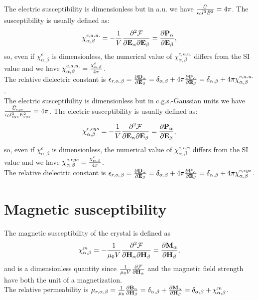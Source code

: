 \documentclass[12pt,a4paper]{article}
\begin{document}
{\color{web-blue} The electric susceptibility is dimensionless but
in a.u. we have
${\bar U \over \epsilon_0 \bar l^3 \bar E^2}=4\pi$. 
The susceptibility is usually defined as:
\begin{equation}
\chi^{e,a.u.}_{\alpha,\beta}=-{1\over V} 
{\partial^2 \mathcal{F} \over \partial 
{\bf E}_{\alpha} \partial {\bf E}_{\beta}}= 
{\partial {\bf P}_\alpha \over \partial {\bf E}_\beta}, 
\end{equation}
so, even if $\chi^e_{\alpha,\beta}$ is dimensionless,  
the numerical value of $\chi^{e,a.u.}_{\alpha,\beta}$ differs from the
SI value and we have
$\chi^{e,a.u.}_{\alpha,\beta} = {\chi^e_{\alpha,\beta} \over 4 \pi}$. \\
The relative dielectric constant is $\epsilon_{r,\alpha,\beta}=
{\partial {\bf D}_{\alpha} \over \partial {\bf E}_{\beta}}=
\delta_{\alpha,\beta} 
+4 \pi {\partial {\bf P}_\alpha \over \partial {\bf E}_\beta} = 
\delta_{\alpha,\beta} + 
4\pi \chi^{e,a.u.}_{\alpha,\beta}$.
}
\\

{\color{orange} The electric susceptibility is dimensionless but
in c.g.s.-Gaussian units we have
${\bar U_{cgs} \over \epsilon_0 \bar l_{cgs}^3 \bar E_{cgs}^2}=4\pi$. 
The electric susceptibility is usually defined as:
\begin{equation}
\chi^{e,cgs}_{\alpha,\beta}=-{1\over V} 
{\partial^2 \mathcal{F} \over \partial 
{\bf E}_{\alpha} \partial {\bf E}_{\beta}}=
{\partial {\bf P}_\alpha \over \partial {\bf E}_\beta}, 
\end{equation}
so, even if $\chi^e_{\alpha,\beta}$ is dimensionless,  
the numerical value of $\chi^{e,cgs}_{\alpha,\beta}$ differs from the
SI value and we have
$\chi^{e,cgs}_{\alpha,\beta} = {\chi^e_{\alpha,\beta} \over 4 \pi}$. \\
The relative dielectric constant is $\epsilon_{r,\alpha,\beta}=
{\partial {\bf D}_{\alpha} \over \partial {\bf E}_{\beta}}=
\delta_{\alpha,\beta} 
+4 \pi {\partial {\bf P}_\alpha \over \partial {\bf E}_\beta} = 
\delta_{\alpha,\beta} + 
4\pi \chi^{e,cgs}_{\alpha,\beta}$.
}

\newpage
\section{\color{coral}Magnetic susceptibility}
The magnetic susceptibility of the crystal is defined as
\begin{equation}
\chi^m_{\alpha,\beta}=-{1\over \mu_0 V} 
{\partial^2 \mathcal{F} \over \partial 
{\bf H}_{\alpha} \partial {\bf H}_{\beta}}=
{\partial {\bf M}_{\alpha} \over \partial {\bf H}_{\beta}},
\end{equation}
and is a dimensionless quantity since ${1\over \mu_0 V}
{\partial \mathcal{F} \over \partial 
{\bf H}_{\alpha}}$ and the magnetic field strength have
both the unit of a magnetization.\\
The relative permeability is $\mu_{r,\alpha,\beta}=
{1\over \mu_0} {\partial {\bf B}_{\alpha} \over \partial {\bf H}_\beta}=
\delta_{\alpha,\beta} 
+{\partial {\bf M}_\alpha \over \partial {\bf H}_\beta} = 
\delta_{\alpha,\beta} + 
\chi^m_{\alpha,\beta}$.
\\
\end{document}
